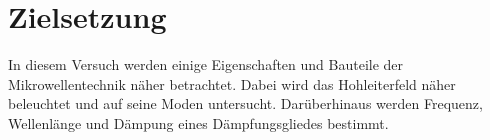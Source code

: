 \section{Zielsetzung}
\label{sec:Zielsetzung}

In diesem Versuch werden einige Eigenschaften und Bauteile der Mikrowellentechnik näher betrachtet. 
Dabei wird das Hohleiterfeld näher beleuchtet und auf seine Moden untersucht. 
Darüberhinaus werden Frequenz, Wellenlänge und Dämpung eines Dämpfungsgliedes bestimmt.

